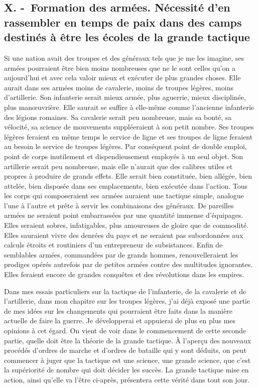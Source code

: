 \documentclass[french,twoside]{book} %
\begin{document}
\subsection[{X. - Formation des armées. Nécessité d’en rassembler en temps de paix dans des camps destinés à être les écoles de la grande tactique}]{X. - Formation des armées. Nécessité d’en rassembler en temps de paix dans des camps destinés à être les écoles de la grande tactique}
\noindent Si une nation avait des troupes et des généraux tels que je me les imagine, ses armées pourraient être bien moins nombreuses que ne le sont celles qu’on a aujourd’hui et avec cela valoir mieux et exécuter de plus grandes choses. Elle aurait dans ses armées moins de cavalerie, moins de troupes légères, moins d’artillerie. Son infanterie serait mieux armée, plus aguerrie, mieux disciplinée, plus manœuvrière. Elle saurait se suffire à elle-même comme l’ancienne infanterie des légions romaines. Sa cavalerie serait peu nombreuse, mais sa bonté, sa vélocité, sa science de mouvements suppléeraient à son petit nombre. Ses troupes légères feraient en même temps le service de ligne et ses troupes de ligne feraient au besoin le service de troupes légères. Par conséquent point de double emploi, point de corps inutilement et dispendieusement employés à un seul objet. Son artillerie serait peu nombreuse, mais elle n’aurait que des calibres utiles et propres à produire de grands effets. Elle serait bien constituée, bien allégée, bien attelée, bien disposée dans ses emplacements, bien exécutée dans l’action. Tous les corps qui composeraient ses armées auraient une tactique simple, analogue l’une à l’autre et prête à servir les combinaisons des généraux. De pareilles armées ne seraient point embarrassées par une quantité immense d’équipages. Elles seraient sobres, infatigables, plus amoureuses de gloire que de commodité. Elles sauraient vivre des denrées du pays et ne seraient pas subordonnées aux calculs étroits et routiniers d’un entrepreneur de subsistances. Enfin de semblables armées, commandées par de grands hommes, renouvelleraient les prodiges opérés autrefois par de petites armées contre des multitudes ignorantes. Elles feraient encore de grandes conquêtes et des révolutions dans les empires.\par
Dans mes essais particuliers sur la tactique de l’infanterie, de la cavalerie et de l’artillerie, dans mon chapitre sur les troupes légères, j’ai déjà exposé une partie de mes idées sur les changements qui pourraient être faits dans la manière actuelle de faire la guerre. Je développerai et appuierai de plus en plus mes opinions à cet égard. On vient de voir dans le commencement de cette seconde partie, quelle doit être la théorie de la grande tactique. À l’aperçu des nouveaux procédés d’ordres de marche et d’ordres de bataille qui y sont déduits, on peut commencer à juger que la tactique est une science, une grande science, que c’est la supériorité de nombre qui doit décider les succès. La grande tactique mise en action, ainsi qu’elle va l’être ci-après, présentera cette vérité dans tout son jour.\par
\end{document}
